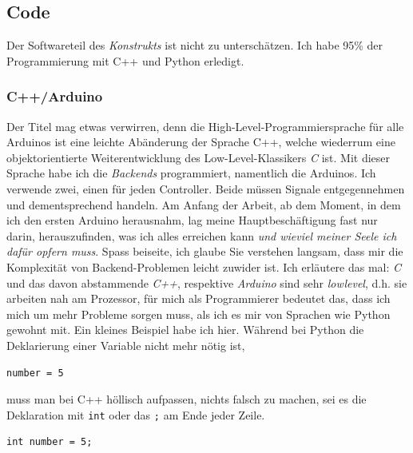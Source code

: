 \documentclass[12pt,titlepage,a4paper]{article}
\begin{document}
\subsection{Code}
Der Softwareteil des \textit{Konstrukts} ist nicht zu unterschätzen. Ich habe 95\% der Programmierung mit C++ und Python erledigt.

\subsubsection{C++/Arduino}
Der Titel mag etwas verwirren, denn die High-Level-Programmiersprache für alle Arduinos ist eine leichte Abänderung der Sprache C++, welche wiederrum eine objektorientierte Weiterentwicklung des Low-Level-Klassikers \textit{C} ist. Mit dieser Sprache habe ich die \textit{Backends} programmiert, namentlich die Arduinos. Ich verwende zwei, einen für jeden Controller. Beide müssen Signale entgegennehmen und dementsprechend handeln. Am Anfang der Arbeit, ab dem Moment, in dem ich den ersten Arduino herausnahm, lag meine Hauptbeschäftigung fast nur darin, herauszufinden, was ich alles erreichen kann \textit{und wieviel meiner Seele ich dafür opfern muss}. Spass beiseite, ich glaube Sie verstehen langsam, dass mir die Komplexität von Backend-Problemen leicht zuwider ist. Ich erläutere das mal: \textit{C} und das davon abstammende \textit{C++}, respektive \textit{Arduino} sind sehr \textit{lowlevel}, d.h. sie arbeiten nah am Prozessor, für mich als Programmierer bedeutet das, dass ich mich um mehr Probleme sorgen muss, als ich es mir von Sprachen wie Python gewohnt mit. Ein kleines Beispiel habe ich hier. Während bei Python die Deklarierung einer Variable nicht mehr nötig ist,
\begin{verbatim}
number = 5
\end{verbatim}
muss man bei C++ höllisch aufpassen, nichts falsch zu machen, sei es die Deklaration mit \verb&int& oder das \verb&;& am Ende jeder Zeile.
\begin{verbatim}
int number = 5;
\end{verbatim}
\end{document}
